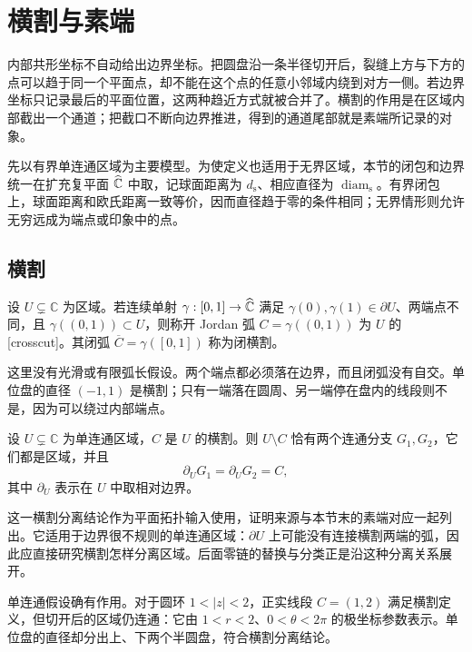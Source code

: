 \section{横割与素端}
\label{b3:sec:0701}

内部共形坐标不自动给出边界坐标。把圆盘沿一条半径切开后，裂缝上方与下方的点可以趋于同一个平面点，却不能在这个点的任意小邻域内绕到对方一侧。若边界坐标只记录最后的平面位置，这两种趋近方式就被合并了。横割的作用是在区域内部截出一个通道；把截口不断向边界推进，得到的通道尾部就是素端所记录的对象。

\ProseParagraphBreak
先以有界单连通区域为主要模型。为使定义也适用于无界区域，本节的闭包和边界统一在扩充复平面 \(\widehat{\mathbb C\kern0pt}\) 中取，记球面距离为 \(d_{\mathrm s}\)、相应直径为 \(\operatorname{diam}_{\mathrm s}\)。有界闭包上，球面距离和欧氏距离一致等价，因而直径趋于零的条件相同；无界情形则允许无穷远成为端点或印象中的点。

\subsection{横割}
\label{b3:subsec:070101}

\begin{definition}\label{b3:def:07-crosscut}
设 \(U\subsetneq\mathbb C\) 为区域。若连续单射 \(\gamma:[0,1]\to\widehat{\mathbb C\kern0pt}\) 满足 \(\gamma(0),\gamma(1)\in\partial U\)、两端点不同，且 \(\gamma((0,1))\subset U\)，则称开 Jordan 弧 \(C=\gamma((0,1))\) 为 \(U\) 的[crosscut]。其闭弧 \(\overline C=\gamma([0,1])\) 称为闭横割。
\end{definition}
这里没有光滑或有限弧长假设。两个端点都必须落在边界，而且闭弧没有自交。单位盘的直径 \((-1,1)\) 是横割；只有一端落在圆周、另一端停在盘内的线段则不是，因为可以绕过内部端点。

\begin{claim}\label{b3:claim:07-crosscut-separation}
设 \(U\subsetneq\mathbb C\) 为单连通区域，\(C\) 是 \(U\) 的横割。则 \(U\setminus C\) 恰有两个连通分支 \(G_1,G_2\)，它们都是区域，并且
\[
 \partial_U G_1=\partial_U G_2=C,
\]
其中 \(\partial_U\) 表示在 \(U\) 中取相对边界。
\end{claim}
这一横割分离结论作为平面拓扑输入使用，证明来源与本节末的素端对应一起列出。它适用于边界很不规则的单连通区域：\(\partial U\) 上可能没有连接横割两端的弧，因此应直接研究横割怎样分离区域。后面零链的替换与分类正是沿这种分离关系展开。

\ProseParagraphBreak
单连通假设确有作用。对于圆环 \(1<|z|<2\)，正实线段 \(C=(1,2)\) 满足横割定义，但切开后的区域仍连通：它由 \(1<r<2\)、\(0<\theta<2\pi\) 的极坐标参数表示。单位盘的直径却分出上、下两个半圆盘，符合横割分离结论。

